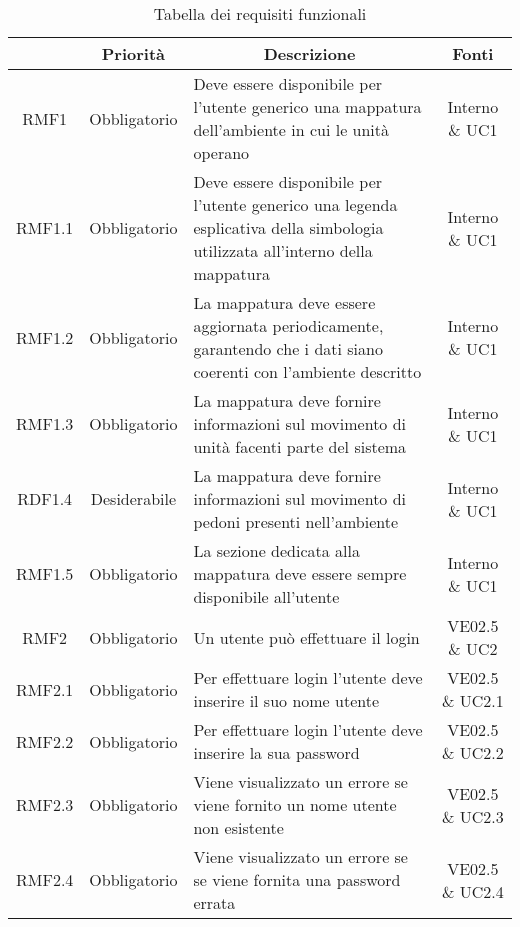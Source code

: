 	\newcommand*{\thead}[1]{\multicolumn{1}{c}{\bfseries #1}}
	\setlength{\tabcolsep}{10pt}
	\begin{longtable}[h!] { c c m{8cm} c}
		\caption{Tabella dei requisiti funzionali} \\
		\rowcolor{lightgray}
		\thead{Requisito} & \thead{Priorità} & \thead{Descrizione} & \thead{Fonti} \\ \endhead%

		RMF1 & Obbligatorio & Deve essere disponibile per l'utente generico una mappatura dell'ambiente in cui le unità operano & Interno \& UC1 \\

		RMF1.1 & Obbligatorio & Deve essere disponibile per l'utente generico una legenda esplicativa della simbologia utilizzata all'interno della mappatura & Interno \& UC1 \\

		RMF1.2 & Obbligatorio & La mappatura deve essere aggiornata periodicamente, garantendo che i dati siano coerenti con l'ambiente descritto & Interno \& UC1 \\

		RMF1.3 & Obbligatorio & La mappatura deve fornire informazioni sul movimento di unità facenti parte del sistema & Interno \& UC1 \\

		RDF1.4 & Desiderabile & La mappatura deve fornire informazioni sul movimento di pedoni presenti nell'ambiente & Interno \& UC1 \\

		RMF1.5 & Obbligatorio & La sezione dedicata alla mappatura deve essere sempre disponibile all'utente & Interno \& UC1 \\

		RMF2 & Obbligatorio & Un utente può effettuare il login & VE02.5 \& UC2 \\

		RMF2.1 & Obbligatorio & Per effettuare login l'utente deve inserire il suo nome utente & VE02.5 \& UC2.1 \\

		RMF2.2 & Obbligatorio & Per effettuare login l'utente deve inserire la sua password & VE02.5 \& UC2.2 \\

		RMF2.3 & Obbligatorio & Viene visualizzato un errore se viene fornito un nome utente non esistente & VE02.5 \& UC2.3 \\

		RMF2.4 & Obbligatorio & Viene visualizzato un errore se se viene fornita una password errata & VE02.5 \& UC2.4 \\


\end{longtable}
